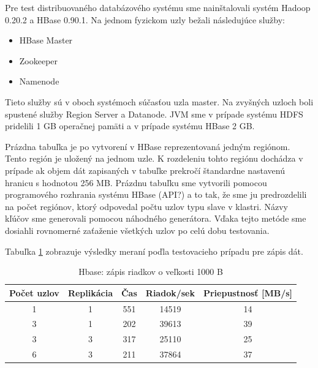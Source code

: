 \documentclass[11pt,twoside,a4paper]{book}
\begin{document}
Pre test distribuovaného databázového systému sme nainštalovali systém Hadoop 0.20.2 a HBase 0.90.1. Na jednom fyzickom uzly bežali následujúce služby:

\begin{itemize}
 \item HBase Master
 \item Zookeeper
 \item Namenode 
\end{itemize}

Tieto služby sú v oboch systémoch súčasťou uzla master. Na zvyšných uzloch boli spustené služby Region Server a Datanode. JVM sme v prípade systému HDFS pridelili 1 GB operačnej pamäti a v prípade systému HBase 2 GB.

Prázdna tabuľka je po vytvorení v HBase reprezentovaná  jedným regiónom. Tento región je uložený na jednom uzle. K rozdeleniu tohto regiónu dochádza v prípade ak objem dát zapisaných v tabuľke prekročí štandardne nastavenú hranicu s hodnotou 256 MB. Prázdnu tabuľku sme vytvorili pomocou programového rozhrania systému HBase (API?) a to tak, že sme ju predrozdelili na počet regiónov, ktorý odpovedal počtu uzlov typu slave v klastri. Názvy kľúčov sme generovali pomocou náhodného generátora. Vďaka tejto metóde sme dosiahli rovnomerné zaťaženie všetkých uzlov po celú dobu testovania.


Tabuľka \ref{tab:HPerf1} zobrazuje výsledky meraní poďla testovacieho prípadu pre zápis dát. 

\begin{table}[hp]
\begin{center}
\begin{tabular}{|c|c|c|c|c|}
\hline Počet uzlov & Replikácia  & Čas & Riadok/sek & Priepustnosť [MB/s]\\ 
\hline
\hline 1 & 1 &  551 & 14519 & 14\\ 
\hline 3 & 1 &  202 & 39613 & 39\\ 
\hline 3 & 3 &  317 & 25110 & 25\\ 
\hline 6 & 3 &  211 & 37864 & 37\\ 
\hline
\end{tabular} 
\end{center}
\caption{Hbase: zápis riadkov o veľkosti 1000 B}
\label{tab:HPerf1}
\end{table}
\end{document}
